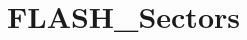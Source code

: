 \hypertarget{group___f_l_a_s_h___sectors}{\section{F\-L\-A\-S\-H\-\_\-\-Sectors}
\label{group___f_l_a_s_h___sectors}
}
